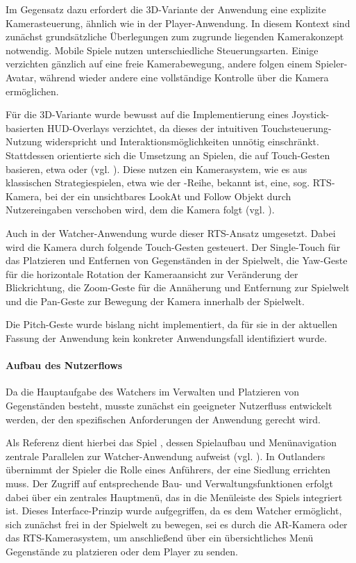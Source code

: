  Im Gegensatz dazu erfordert die \ac{3D}-Variante der Anwendung eine explizite Kamerasteuerung, ähnlich wie in der Player-Anwendung. In diesem Kontext sind zunächst grundsätzliche Überlegungen zum zugrunde liegenden Kamerakonzept notwendig. Mobile Spiele nutzen unterschiedliche Steuerungsarten. Einige verzichten gänzlich auf eine freie Kamerabewegung, andere folgen einem Spieler-Avatar, während wieder andere eine vollständige Kontrolle über die Kamera ermöglichen.

 Für die \ac{3D}-Variante wurde bewusst auf die Implementierung eines Joystick-basierten \ac{HUD}-Overlays verzichtet, da dieses der intuitiven Touchsteuerung-Nutzung widerspricht und Interaktionsmöglichkeiten unnötig einschränkt. Stattdessen orientierte sich die Umsetzung an Spielen, die auf Touch-Gesten basieren, etwa  oder  (vgl. \citealp{arts_sims_2018, pomelo_games_outlanders_2019}). Diese nutzen ein Kamerasystem, wie es aus klassischen Strategiespielen, etwa wie der -Reihe, bekannt ist, eine, sog. \ac{RTS}-Kamera, bei der ein unsichtbares LookAt und Follow Objekt durch Nutzereingaben verschoben wird, dem die Kamera folgt (vgl. \citealp{ubisoft_mainz_ubisoft_2019}). 

Auch in der Watcher-Anwendung wurde dieser \ac{RTS}-Ansatz umgesetzt. Dabei wird die Kamera durch folgende Touch-Gesten gesteuert.
Der Single-Touch für das Platzieren und Entfernen von Gegenständen in der Spielwelt, die Yaw-Geste für die horizontale Rotation der Kameraansicht zur Veränderung der Blickrichtung, die Zoom-Geste für die Annäherung und Entfernung zur Spielwelt und die Pan-Geste zur Bewegung der Kamera innerhalb der Spielwelt.

Die Pitch-Geste wurde bislang nicht implementiert, da für sie in der aktuellen Fassung der Anwendung kein konkreter Anwendungsfall identifiziert wurde.

\paragraph{Aufbau des Nutzerflows}

Da die Hauptaufgabe des Watchers im Verwalten und Platzieren von Gegenständen besteht, musste zunächst ein geeigneter Nutzerfluss entwickelt werden, der den spezifischen Anforderungen der Anwendung gerecht wird. 

Als Referenz dient hierbei das Spiel , dessen Spielaufbau und Menünavigation zentrale Parallelen zur Watcher-Anwendung aufweist (vgl. \citealp{pomelo_games_outlanders_2019}). In Outlanders übernimmt der Spieler die Rolle eines Anführers, der eine Siedlung errichten muss. Der Zugriff auf entsprechende Bau- und Verwaltungsfunktionen erfolgt dabei über ein zentrales Hauptmenü, das in die Menüleiste des Spiels integriert ist. Dieses Interface-Prinzip wurde aufgegriffen, da es dem Watcher ermöglicht, sich zunächst frei in der Spielwelt zu bewegen, sei es durch die \ac{AR}-Kamera oder das \ac{RTS}-Kamerasystem, um anschließend über ein übersichtliches Menü Gegenstände zu platzieren oder dem Player zu senden.

